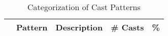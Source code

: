 \begin{table*}[t!]
\scriptsize
\centering
\caption{Categorization of Cast Patterns}
\label{table:casts:patterns}
\begin{tabularx}{\linewidth}{|r|l|X|r|r|}
\hline
  & \multicolumn{1}{|c|}{\textbf{Pattern}}
  & \multicolumn{1}{|c|}{\textbf{Description}}
  & \multicolumn{1}{|c|}{\textbf{\# Casts}}
  & \multicolumn{1}{|c|}{\textbf{\%}}
  \\ \hline

\hline
\end{tabularx}
\end{table*}
